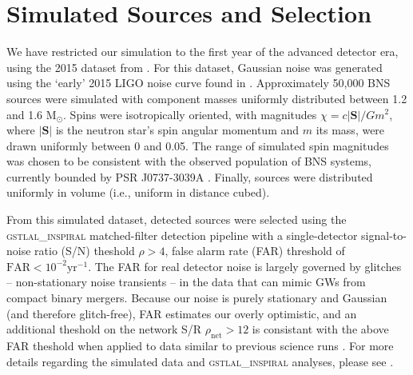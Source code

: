 \section{Simulated Sources and Selection}

We have restricted our simulation to the first year of the advanced detector era, using the 2015 dataset from \citet{Singer_2014}.  For this dataset, Gaussian noise was generated using the `early' 2015 LIGO noise curve found in \cite{Barsotti:2012}.  Approximately 50,000 BNS sources were simulated with component masses uniformly distributed between 1.2 and 1.6 $\mathrm{M}_\odot$.  Spins were isotropically oriented, with magnitudes $\chi = c |\mathbf{S}|/G m^2$, where $|\mathbf{S}|$ is the neutron star's spin angular momentum and $m$ its mass, were drawn uniformly between 0 and 0.05.  The range of simulated spin magnitudes was chosen to be consistent with the observed population of BNS systems, currently bounded by PSR J0737-3039A \cite{Burgay_2003,Brown_2012}.  Finally, sources were distributed uniformly in volume (i.e., uniform in distance cubed).

From this simulated dataset, detected sources were selected using the \textsc{gstlal\_inspiral} matched-filter detection pipeline \cite{Cannon_2012} with a single-detector signal-to-noise ratio (S/N) theshold $\rho>4$, false alarm rate (FAR) threshold of $\mathrm{FAR}<10^{-2}\mathrm{yr}^{-1}$.  The FAR for real detector noise is largely governed by glitches -- non-stationary noise transients -- in the data that can mimic GWs from compact binary mergers.  Because our noise is purely stationary and Gaussian (and therefore glitch-free), FAR estimates our overly optimistic, and an additional theshold on the network S/R $\rho_\mathrm{net} > 12$ is consistant with the above FAR theshold when applied to data similar to previous science runs \cite{2013arXiv1304.0670L}.  For more details regarding the simulated data and \textsc{gstlal\_inspiral} analyses, please see \citet{Singer_2014}.